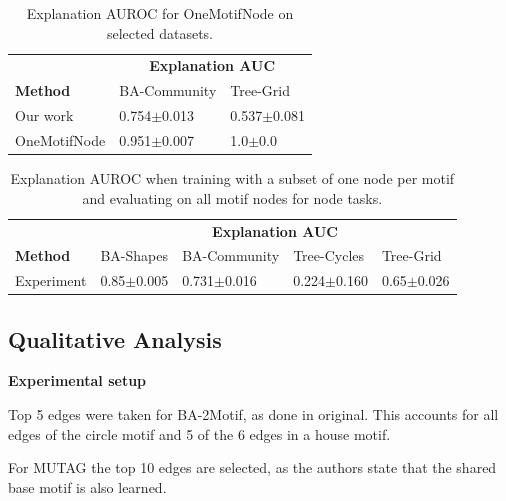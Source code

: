\begin{table}[ht]
    \centering
    \scriptsize
    \begin{tabularx}{0.6\textwidth}{l*{2}{X}}   %
    \toprule
    \textbf{} & \multicolumn{2}{c}{\textbf{Explanation AUC}} \\
    \cmidrule{2-3}
    \textbf{Method} & BA-Community & Tree-Grid \\
    \midrule
    Our work & 0.754$\pm$0.013 & 0.537$\pm$0.081 \\
    \midrule
    OneMotifNode & 0.951$\pm$0.007 & 1.0$\pm$0.0 \\
    \bottomrule
    \end{tabularx}
    \caption[Inductive performance using one motif node for training]{Explanation AUROC for OneMotifNode on selected datasets.}
    \label{tab:allmotifnodes_selected}
\end{table}


\begin{table}[ht]
    \centering
    \scriptsize
    \begin{tabularx}{0.6\textwidth}{l*{4}{X}}   %
    \toprule
    \textbf{} & \multicolumn{4}{c}{\textbf{Explanation AUC}} \\
    \cmidrule{2-5}
    \textbf{Method} & BA-Shapes & BA-Community & Tree-Cycles & Tree-Grid \\
    \midrule
    Experiment & 0.85$\pm$0.005 & 0.731$\pm$0.016 & 0.224$\pm$0.160 & 0.65$\pm$0.026 \\
    \bottomrule
    \end{tabularx}
    \caption[Inductive performance using one motif node for training and all other motif nodes for evaluation]{Explanation AUROC when training with a subset of one node per motif and evaluating on all motif nodes for node tasks.}
    \label{tab:allmotifnodes_selected}
\end{table}

\subsection{Qualitative Analysis}

\textbf{Experimental setup}

Top 5 edges were taken for BA-2Motif, as done in original. This accounts for all edges of the circle motif and 5 of the 6 edges in a house motif.

For MUTAG the top 10 edges are selected, as the authors state that the shared base motif is also learned.

